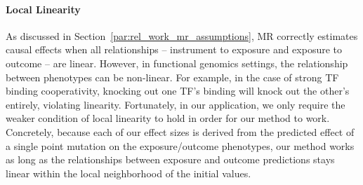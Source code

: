 \paragraph{Local Linearity}%
\label{par:meth_local_linearity}
As discussed in Section~\ref{par:rel_work_mr_assumptions}, MR correctly estimates causal effects when all relationships -- instrument to exposure and exposure to outcome -- are linear. However, in functional genomics settings, the relationship between phenotypes can be non-linear. For example, in the case of strong TF binding cooperativity, knocking out one TF's binding will knock out the other's entirely, violating linearity. Fortunately, in our application, we only require the weaker condition of local linearity to hold in order for our method to work. Concretely, because each of our effect sizes is derived from the predicted effect of a single point mutation on the exposure/outcome phenotypes, our method works as long as the relationships between exposure and outcome predictions stays linear within the local neighborhood of the initial values.















